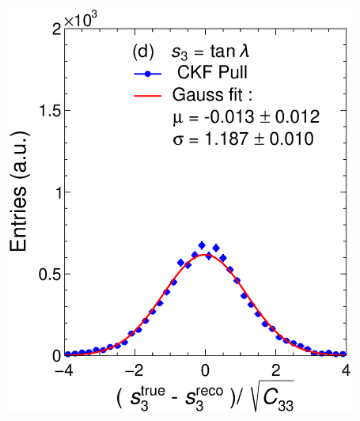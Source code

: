 \begin{figure}[t]
\begin{subfigure}{0.32\textwidth}
         \caption{}
         \label{fig:resp2KFGAr_IntI}
     \end{subfigure}
          \begin{subfigure}{0.32\textwidth}
         \centering
         \includegraphics[width=\textwidth]{figures/ch5-KF_NDGAr/FullSample/Int/Units/IdealUnit3.eps}
         \caption{}
         \label{fig:resp3KFGAr_IntI}
     \end{subfigure}
     \begin{subfigure}{0.32\textwidth}
         \centering

\end{subfigure}
\end{figure}
